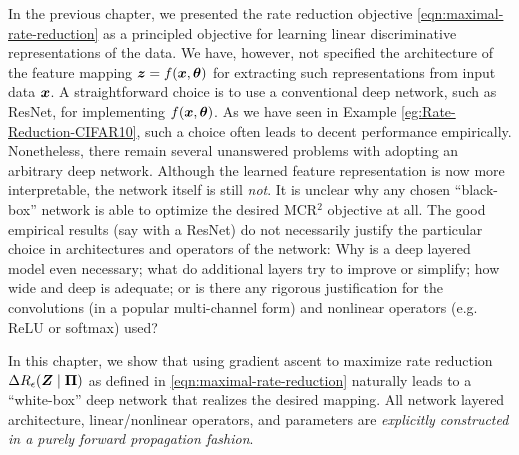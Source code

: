 \documentclass[\toplevelprefix/book-main.tex]{subfiles}
\begin{document}
In the previous chapter, we presented the rate reduction objective \eqref{eqn:maximal-rate-reduction} as a principled objective for learning linear discriminative representations of the data. We have, however, not specified the architecture of the feature mapping $\bm{z} = f(\bm{x}, \bm \theta)$ for extracting such representations from input data $\bm{x}$. 
A straightforward choice is to use a conventional deep network, such as ResNet, for implementing $f(\bm{x}, \bm \theta)$. As we have seen in Example \ref{eg:Rate-Reduction-CIFAR10}, such a choice often leads to decent performance empirically. Nonetheless, there remain several unanswered problems with adopting an arbitrary deep network. Although the learned feature representation is now more interpretable, the network itself is still {\em not}. It is unclear why any chosen ``black-box'' network is able to optimize the desired MCR$^2$ objective at all. The good empirical results (say with a ResNet) do not necessarily justify the particular choice in architectures and operators of the network: Why is a deep layered model even necessary; what do additional layers try to improve or simplify; how wide and deep is adequate; or is there any rigorous justification for the convolutions (in a popular multi-channel form) and nonlinear operators (e.g. ReLU or softmax) used? 

In this chapter, we show that using gradient ascent to maximize rate reduction $\Delta R_{\epsilon}(\bm{Z} \mid \bm \Pi)$ as defined in \eqref{eqn:maximal-rate-reduction} naturally leads to a ``white-box'' deep network that realizes the desired mapping. All network layered architecture, linear/nonlinear operators, and parameters are {\em explicitly constructed in a purely forward propagation fashion}. 
\end{document}
